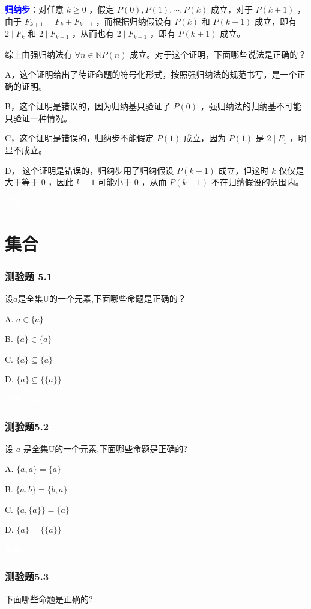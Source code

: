 \documentclass[UTF8, heading=true]{ctexart}
\begin{document}
\textcolor{blue}{\textbf{归纳步}}：对任意 $k \geq 0$ ，假定 $P(0), P(1), \cdots, P(k)$ 成立，对于 $P(k+1)$ ，由于 $F_{k+1}=F_k+F_{k-1}$ ，而根据归纳假设有 $P(k)$ 和 $P(k-1)$ 成立，即有 $2 \mid F_k$ 和 $2 \mid F_{k-1}$ ，从而也有 $2 \mid F_{k+1}$ ，即有 $P(k+1)$ 成立。

综上由强归纳法有 $\forall n \in \mathbb{N} P(n)$ 成立。对于这个证明，下面哪些说法是正确的？

A，这个证明给出了待证命题的符号化形式，按照强归纳法的规范书写，是一个正确的证明。

B，这个证明是错误的，因为归纳基只验证了 $P(0)$ ，强归纳法的归纳基不可能只验证一种情况。

C，这个证明是错误的，归纳步不能假定 $P(1)$ 成立，因为 $P(1)$ 是 $2 \mid F_1$ ，明显不成立。

D，
这个证明是错误的，归纳步用了归纳假设 $P(k-1)$ 成立，但这时 $k$ 仅仅是大于等于 0 ，因此 $k-1$ 可能小于 0 ，从而 $P(k-1)$ 不在归纳假设的范围内。

\textcolor{white}{答案：D}

\clearpage

\section{集合}

\subsubsection{测验题 5.1}
设$a$是全集U的一个元素,下面哪些命题是正确的？

A. $ a \in\{a\}$

B. $\{a\} \in\{a\}$

C. $\{a\} \subseteq\{a\}$

D. $\{a\} \subseteq\{\{a\}\}$

\textcolor{white}{答案：AC}

\subsubsection{测验题5.2}

设 $a$ 是全集U的一个元素,下面哪些命题是正确的?

A. $\{a, a\}=\{a\}$

B. $\{a, b\}=\{b, a\}$

C. $\{a,\{a\}\}=\{a\}$

D. $\{a\}=\{\{a\}\}$

\textcolor{white}{答案：AB}

\subsubsection{测验题5.3}
下面哪些命题是正确的?
\end{document}
